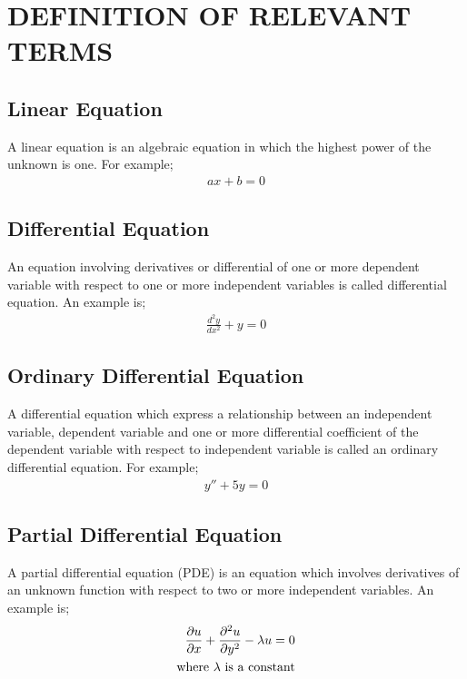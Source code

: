 \documentclass[11pt]{report}
\newcommand{\dprime}{''}
\begin{document}
		\section{DEFINITION OF RELEVANT TERMS}
	\subsection{Linear Equation}
	A linear equation is an algebraic equation in which the highest power of the unknown is one. For example;
	\begin{eqnarray}
		ax+b=0\label{eq:3_3}
	\end{eqnarray}
	
	\subsection{Differential Equation}
	An equation involving derivatives or differential of one or more dependent variable with respect to one or more independent variables is called differential equation. An example is;
	\begin{eqnarray}
		\frac{d^2y}{dx^2} + y = 0\label{eq:3_4}
	\end{eqnarray}
	
	\subsection{Ordinary Differential Equation}
	A differential equation which express a relationship between an independent variable, dependent variable and one or more differential coefficient of the dependent variable with respect to independent variable is called an ordinary differential equation. For example;
	\begin{eqnarray}
		y\dprime + 5y = 0 \label{eq:3_5}
	\end{eqnarray}
	
	\subsection{Partial Differential Equation}
	A partial differential equation (PDE) is an equation which involves derivatives of an unknown function with respect to two or more independent variables. An example is;
	\begin{eqnarray}
		\frac{\partial u}{\partial x} + \frac{\partial^2u}{\partial y^2} - \lambda u = 0\label{eq:3_6}\\
		\text{where }\lambda \text{ is a constant}\notag
	\end{eqnarray}
\end{document}
